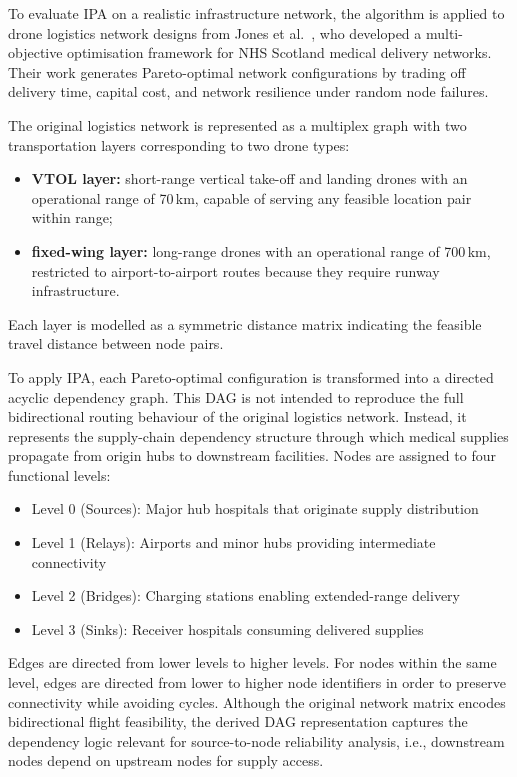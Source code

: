 \documentclass[preprint,12pt]{elsarticle}
\begin{document}
To evaluate IPA on a realistic infrastructure network, the algorithm is applied to drone logistics network designs from Jones et al.~\cite{jones_drone_2025}, who developed a multi-objective optimisation framework for NHS Scotland medical delivery networks. Their work generates Pareto-optimal network configurations by trading off delivery time, capital cost, and network resilience under random node failures.

The original logistics network is represented as a multiplex graph with two transportation layers corresponding to two drone types:
\begin{itemize}
    \item \textbf{VTOL layer:} short-range vertical take-off and landing drones with an operational range of 70\,km, capable of serving any feasible location pair within range;
    \item \textbf{fixed-wing layer:} long-range drones with an operational range of 700\,km, restricted to airport-to-airport routes because they require runway infrastructure.
\end{itemize}
Each layer is modelled as a symmetric distance matrix indicating the feasible travel distance between node pairs. 

To apply IPA, each Pareto-optimal configuration is transformed into a directed acyclic dependency graph. This DAG is not intended to reproduce the full bidirectional routing behaviour of the original logistics network. Instead, it represents the supply-chain dependency structure through which medical supplies propagate from origin hubs to downstream facilities. 
Nodes are assigned to four functional levels:
\begin{itemize}
    \item Level 0 (Sources): Major hub hospitals that originate supply distribution
    \item Level 1 (Relays): Airports and minor hubs providing intermediate connectivity
    \item Level 2 (Bridges): Charging stations enabling extended-range delivery
    \item Level 3 (Sinks): Receiver hospitals consuming delivered supplies
\end{itemize}

Edges are directed from lower levels to higher levels. For nodes within the same level, edges are directed from lower to higher node identifiers in order to preserve connectivity while avoiding cycles. Although the original network matrix encodes bidirectional flight feasibility, the derived DAG representation captures the dependency logic relevant for source-to-node reliability analysis, i.e., downstream nodes depend on upstream nodes for supply access.
\end{document}
